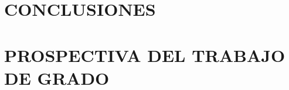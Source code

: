 \documentclass[12pt,letterpaper,oneside]{report}
\begin{document}
		\chapter{CONCLUSIONES}
			
		\chapter{PROSPECTIVA DEL TRABAJO DE GRADO}
			
	
	
	
	
\end{document}
